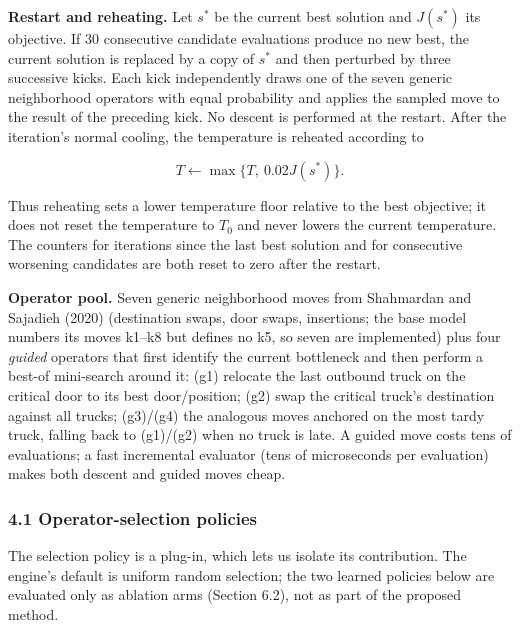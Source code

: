 \documentclass[
]{article}
\begin{document}
\textbf{Restart and reheating.} Let \(s^*\) be the current best solution
and \(J(s^*)\) its objective. If 30 consecutive candidate evaluations
produce no new best, the current solution is replaced by a copy of
\(s^*\) and then perturbed by three successive kicks. Each kick
independently draws one of the seven generic neighborhood operators with
equal probability and applies the sampled move to the result of the
preceding kick. No descent is performed at the restart. After the
iteration's normal cooling, the temperature is reheated according to

\[
T\leftarrow\max\{T,\ 0.02J(s^*)\}. \tag{17}
\]

Thus reheating sets a lower temperature floor relative to the best
objective; it does not reset the temperature to \(T_0\) and never lowers
the current temperature. The counters for iterations since the last best
solution and for consecutive worsening candidates are both reset to zero
after the restart.

\textbf{Operator pool.} Seven generic neighborhood moves from Shahmardan
and Sajadieh (2020) (destination swaps, door swaps, insertions; the base
model numbers its moves k1--k8 but defines no k5, so seven are
implemented) plus four \emph{guided} operators that first identify the
current bottleneck and then perform a best-of mini-search around it:
(g1) relocate the last outbound truck on the critical door to its best
door/position; (g2) swap the critical truck's destination against all
trucks; (g3)/(g4) the analogous moves anchored on the most tardy truck,
falling back to (g1)/(g2) when no truck is late. A guided move costs
tens of evaluations; a fast incremental evaluator (tens of microseconds
per evaluation) makes both descent and guided moves cheap.

\subsubsection{4.1 Operator-selection
policies}\label{operator-selection-policies}

The selection policy is a plug-in, which lets us isolate its
contribution. The engine's default is uniform random selection; the two
learned policies below are evaluated only as ablation arms (Section
6.2), not as part of the proposed method.
\end{document}
